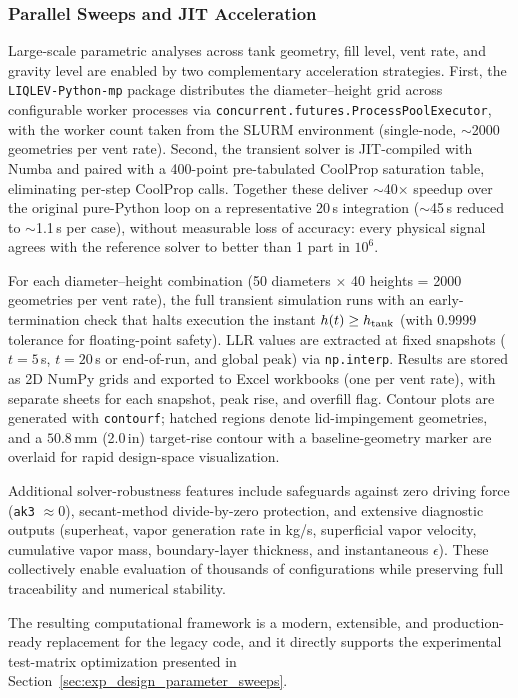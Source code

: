 \documentclass[conf]{new-aiaa}
\begin{document}
\subsubsection{Parallel Sweeps and JIT Acceleration}
Large-scale parametric analyses across tank geometry, fill level, vent rate, and gravity level are enabled by two complementary acceleration strategies. First, the \texttt{LIQLEV-Python-mp} package distributes the diameter--height grid across configurable worker processes via \texttt{concurrent.futures.ProcessPoolExecutor}, with the worker count taken from the SLURM environment (single-node, $\sim$2000 geometries per vent rate). Second, the transient solver is JIT-compiled with Numba and paired with a 400-point pre-tabulated CoolProp saturation table, eliminating per-step CoolProp calls. Together these deliver $\sim$40$\times$ speedup over the original pure-Python loop on a representative 20\,s integration ($\sim$45\,s reduced to $\sim$1.1\,s per case), without measurable loss of accuracy: every physical signal agrees with the reference solver to better than 1 part in $10^6$.

For each diameter--height combination (50 diameters $\times$ 40 heights = 2000 geometries per vent rate), the full transient simulation runs with an early-termination check that halts execution the instant $h(t) \geq h_{\rm tank}$ (with 0.9999 tolerance for floating-point safety). LLR values are extracted at fixed snapshots ($t = 5\,$s, $t = 20\,$s or end-of-run, and global peak) via \texttt{np.interp}. Results are stored as 2D NumPy grids and exported to Excel workbooks (one per vent rate), with separate sheets for each snapshot, peak rise, and overfill flag. Contour plots are generated with \texttt{contourf}; hatched regions denote lid-impingement geometries, and a $50.8\,$mm (2.0\,in) target-rise contour with a baseline-geometry marker are overlaid for rapid design-space visualization.

Additional solver-robustness features include safeguards against zero driving force (\texttt{ak3} $\approx 0$), secant-method divide-by-zero protection, and extensive diagnostic outputs (superheat, vapor generation rate in kg/s, superficial vapor velocity, cumulative vapor mass, boundary-layer thickness, and instantaneous $\epsilon$). These collectively enable evaluation of thousands of configurations while preserving full traceability and numerical stability.

The resulting computational framework is a modern, extensible, and production-ready replacement for the legacy code, and it directly supports the experimental test-matrix optimization presented in Section~\ref{sec:exp_design_parameter_sweeps}.
\end{document}
